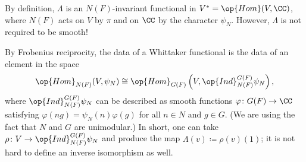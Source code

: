 \documentclass[../notes.tex]{subfiles}
\begin{document}
\begin{remark}
	By definition, $\Lambda$ is an $N(F)$-invariant functional in $V^*=\op{Hom}(V,\CC)$, where $N(F)$ acts on $V$ by $\pi$ and on $\CC$ by the character $\psi_N$. However, $\Lambda$ is not required to be smooth!
\end{remark}
\begin{remark} \label{rem:whittaker-to-embed}
	By Frobenius reciprocity, the data of a Whittaker functional is the data of an element in the space
	\[\op{Hom}_{N(F)}(V,\psi_N)\cong\op{Hom}_{G(F)}\left(V,\op{Ind}_{N(F)}^{G(F)}\psi_N\right),\]
	where $\op{Ind}_{N(F)}^{G(F)}\psi_N$ can be described as smooth functions $\varphi\colon G(F)\to\CC$ satisfying $\varphi(ng)=\psi_N(n)\varphi(g)$ for all $n\in N$ and $g\in G$. (We are using the fact that $N$ and $G$ are unimodular.) In short, one can take $\rho\colon V\to\op{Ind}_{N(F)}^{G(F)}\psi_N$ and produce the map $\Lambda(v)\coloneqq\rho(v)(1)$; it is not hard to define an inverse isomorphism as well.
\end{remark}
\end{document}
